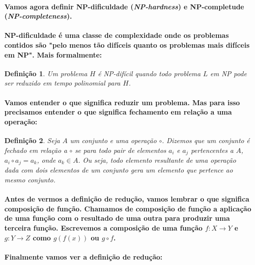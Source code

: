 \documentclass[a4paper,10pt]{article}
\theoremstyle{plain}
\newtheorem*{spn-def}{Definição}
\begin{document}
\paragraph{
  Vamos agora definir NP-dificuldade (\textit{NP-hardness}) e NP-completude
  (\textit{NP-completeness}).
}

\paragraph{
  NP-dificuldade é uma classe de complexidade onde os problemas contidos são "pelo menos tão
  difíceis quanto os problemas mais difíceis em NP". Mais formalmente:
}

\begin{spn-def} Um problema $H$ é NP-difícil quando todo problema $L$ em NP pode ser reduzido em
  tempo polinomial para $H$.
\end{spn-def}

\paragraph{
  Vamos entender o que significa reduzir um problema. Mas para isso precisamos entender o que
  significa fechamento em relação a uma operação:
}

\begin{spn-def} Seja $A$ um conjunto e uma operação $\circ$. Dizemos que um conjunto é
  \textit{fechado em relação a} $\circ$ se para todo pair de elementos $a_i$ e $a_j$ pertencentes
  a $A$, $a_i \circ a_j = a_k$, onde $a_k \in A$. Ou seja, todo elemento resultante de uma operação
  dada com dois elementos de um conjunto gera um elemento que pertence ao mesmo conjunto.
\end{spn-def}

\paragraph{
  Antes de vermos a definição de redução, vamos lembrar o que significa composição de função.
  Chamamos de composição de função a aplicação de uma função com o resultado de uma outra para
  produzir uma terceira função. Escrevemos a composição de uma função $f:X \to Y$ e $g:Y \to
  Z$ como $g(f(x))$ ou $g \circ f$.
}

\paragraph{
  Finalmente vamos ver a definição de redução:
}
\end{document}
